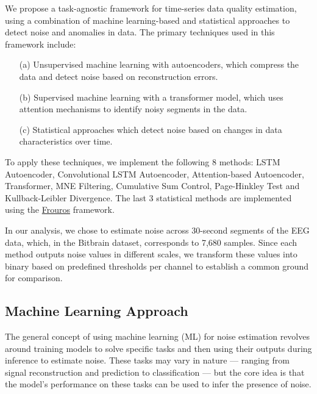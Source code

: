We propose a task-agnostic framework for time-series data quality estimation, using a combination of machine learning-based and statistical approaches to detect noise and anomalies in data. The primary techniques used in this framework include:

\begin{enumerate}
    \item[(a)] Unsupervised machine learning with autoencoders, which compress the data and detect noise based on reconstruction errors.\\
    \vspace{-0.8cm}
    \item[(b)] Supervised machine learning with a transformer model, which uses attention mechanisms to identify noisy segments in the data.\\
    \vspace{-0.8cm}
    \item[(c)] Statistical approaches which detect noise based on changes in data characteristics over time.
\end{enumerate}

To apply these techniques, we implement the following 8 methods: LSTM Autoencoder, Convolutional LSTM Autoencoder, Attention-based Autoencoder, Transformer, MNE Filtering, Cumulative Sum Control, Page-Hinkley Test and Kullback-Leibler Divergence. The last 3 statistical methods are implemented using the \href{https://github.com/IFCA-Advanced-Computing/frouros}{Frouros} framework.

In our analysis, we chose to estimate noise across 30-second segments of the EEG data, which, in the Bitbrain dataset, corresponds to 7,680 samples. Since each method outputs noise values in different scales, we transform these values into binary based on predefined thresholds per channel to establish a common ground for comparison.

\subsection{Machine Learning Approach}
The general concept of using machine learning (ML) for noise estimation revolves around training models to solve specific tasks and then using their outputs during inference to estimate noise. These tasks may vary in nature — ranging from signal reconstruction and prediction to classification — but the core idea is that the model’s performance on these tasks can be used to infer the presence of noise.


